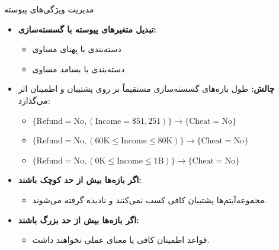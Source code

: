 \begin{frame}{مدیریت ویژگی‌های پیوسته}{}
\begin{itemize}\setlength{\itemsep}{4pt}
    \item \textbf{تبدیل متغیرهای پیوسته با گسسته‌سازی:} 
    \begin{itemize}\setlength{\itemsep}{2pt}
        \item دسته‌بندی با پهنای مساوی 
        \item دسته‌بندی با بسامد مساوی 
    \end{itemize}
    \vspace{0.15cm}
    \item \textbf{چالش:} طول بازه‌های گسسته‌سازی مستقیماً بر روی پشتیبان و اطمینان اثر می‌گذارد:
    \begin{latin}
    \begin{itemize}\small\setlength{\itemsep}{1pt}
        \item $\{\text{Refund}=\text{No}, (\text{Income}=\$51{,}251)\} \to \{\text{Cheat}=\text{No}\}$
        \item $\{\text{Refund}=\text{No}, (60\text{K} \le \text{Income} \le 80\text{K})\} \to \{\text{Cheat}=\text{No}\}$
        \item $\{\text{Refund}=\text{No}, (0\text{K} \le \text{Income} \le 1\text{B})\} \to \{\text{Cheat}=\text{No}\}$
    \end{itemize}
    \end{latin}
    \vspace{0.15cm}
    \item \textbf{اگر بازه‌ها بیش از حد کوچک باشند:}
    \begin{itemize}\footnotesize
        \item مجموعه‌آیتم‌ها پشتیبان کافی کسب نمی‌کنند و نادیده گرفته می‌شوند.
    \end{itemize}
    \item \textbf{اگر بازه‌ها بیش از حد بزرگ باشند:}
    \begin{itemize}\footnotesize
        \item قواعد اطمینان کافی یا معنای عملی نخواهند داشت.
    \end{itemize}
\end{itemize}
\end{frame}
